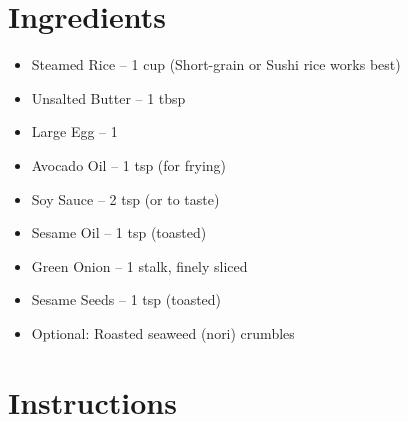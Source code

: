 




\section*{Ingredients}

\begin{itemize}
    \item Steamed Rice – 1 cup (Short-grain or Sushi rice works best)
    \item Unsalted Butter – 1 tbsp
    \item Large Egg – 1
    \item[\measure] Avocado Oil – 1 tsp (for frying)
    \item[\measure] Soy Sauce – 2 tsp (or to taste)
    \item[\measure] Sesame Oil – 1 tsp (toasted)
    \item[\cut] Green Onion – 1 stalk, finely sliced
    \item[\measure] Sesame Seeds – 1 tsp (toasted)
    \item Optional: Roasted seaweed (nori) crumbles
\end{itemize}

\newpage


\section*{Instructions}


